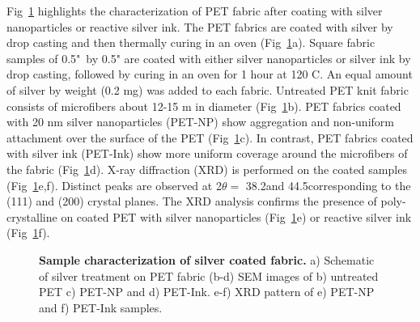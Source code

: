 \documentclass[10pt,letterpaper]{article}
\begin{document}
Fig~\ref{fig1} highlights the characterization of PET fabric after coating with silver nanoparticles or reactive silver ink.  
The PET fabrics are coated with silver by drop casting and then thermally curing in an oven %
(Fig~\ref{fig1}a).  Square fabric samples of 
0.5"~by 0.5" are coated with either silver nanoparticles or silver ink by drop casting, followed by curing in an oven for 1 hour at 120 \degree C. An equal amount of silver by weight (0.2 mg) was added to each fabric. 
Untreated PET knit fabric consists of microfibers about 12-15 \micro m in diameter (Fig~\ref{fig1}b). %
PET fabrics coated with 20 nm silver nanoparticles (PET-NP) show aggregation and non-uniform attachment over the surface of the PET (Fig~\ref{fig1}c).  
In contrast, PET fabrics %
coated with silver ink (PET-Ink) 
show more uniform coverage around the microfibers of the fabric (Fig~\ref{fig1}d). 
X-ray diffraction (XRD) is performed on the coated samples (Fig~\ref{fig1}e,f). %
Distinct peaks are observed at 2$\theta =$ 38.2\degree and 44.5\degree corresponding to the (111) and (200) crystal planes. 
The XRD analysis confirms the presence of poly-crystalline on coated PET with silver nanoparticles (Fig~\ref{fig1}e) or reactive silver ink (Fig~\ref{fig1}f). 

\begin{figure}[!h]
\caption{{\bf Sample characterization of silver coated fabric.}
a) Schematic of silver treatment on PET fabric (b-d) SEM images of b) untreated PET c) PET-NP and d) PET-Ink. e-f) XRD pattern of e) PET-NP and f) PET-Ink samples.}
\label{fig1}
\end{figure}

\end{document}
